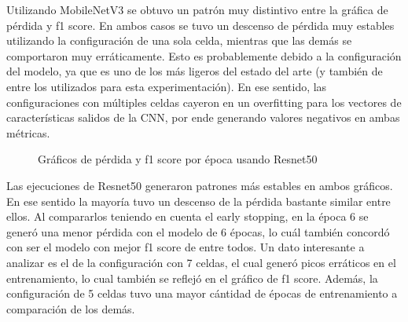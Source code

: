Utilizando MobileNetV3 se obtuvo un patrón muy distintivo entre la 
gráfica de pérdida y f1 score. En ambos casos se tuvo un descenso de 
pérdida muy estables utilizando la configuración de una sola celda, 
mientras que las demás se comportaron muy erráticamente. Esto es 
probablemente debido a la configuración del modelo, ya que es uno de 
los más ligeros del estado del arte (y también de entre los utilizados 
para esta experimentación). En ese sentido, las configuraciones con 
múltiples celdas cayeron en un overfitting para los vectores de 
características salidos de la CNN, por ende generando valores negativos 
en ambas métricas. 

\begin{figure}[h!]
    \centering
    \hfill
    \caption{Gráficos de pérdida y f1 score por época usando Resnet50}
    \label{fig:Resnet50}
\end{figure}

Las ejecuciones de Resnet50 generaron patrones más estables 
en ambos gráficos. En ese sentido la mayoría tuvo un descenso 
de la pérdida bastante similar entre ellos. Al compararlos 
teniendo en cuenta el early stopping, en la época 6 se 
generó una menor pérdida con el modelo de 6 épocas, lo cuál 
también concordó con ser el modelo con mejor f1 score de entre 
todos. Un dato interesante a analizar es el de la configuración 
con 7 celdas, el cual generó picos erráticos en el entrenamiento, 
lo cual también se reflejó en el gráfico de f1 score. Además, 
la configuración de 5 celdas tuvo una mayor cántidad de épocas 
de entrenamiento a comparación de los demás.

